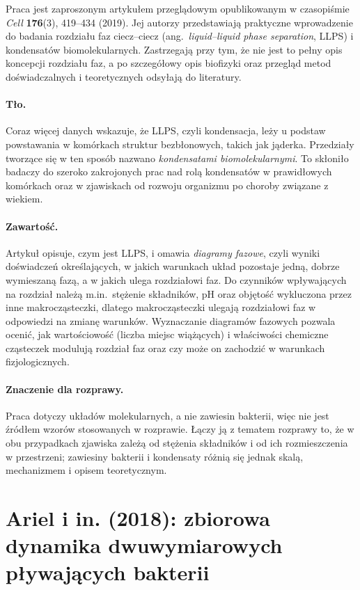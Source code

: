 \documentclass[12pt,a4paper,twoside,openright]{report}
\theoremstyle{definition}
\theoremstyle{remark}
\begin{document}
Praca \cite{alberti2019considerations} jest zaproszonym artykułem przeglądowym opublikowanym w czasopiśmie \emph{Cell} \textbf{176}(3), 419--434 (2019). Jej autorzy przedstawiają praktyczne wprowadzenie do badania rozdziału faz ciecz--ciecz (ang.\ \emph{liquid--liquid phase separation}, LLPS) i kondensatów biomolekularnych. Zastrzegają przy tym, że nie jest to pełny opis koncepcji rozdziału faz, a po szczegółowy opis biofizyki oraz przegląd metod doświadczalnych i teoretycznych odsyłają do literatury.

\paragraph{Tło.} Coraz więcej danych wskazuje, że LLPS, czyli kondensacja, leży u podstaw powstawania w komórkach struktur bezbłonowych, takich jak jąderka. Przedziały tworzące się w ten sposób nazwano \emph{kondensatami biomolekularnymi}. To skłoniło badaczy do szeroko zakrojonych prac nad rolą kondensatów w prawidłowych komórkach oraz w zjawiskach od rozwoju organizmu po choroby związane z wiekiem.

\paragraph{Zawartość.} Artykuł opisuje, czym jest LLPS, i omawia \emph{diagramy fazowe}, czyli wyniki doświadczeń określających, w jakich warunkach układ pozostaje jedną, dobrze wymieszaną fazą, a w jakich ulega rozdziałowi faz. Do czynników wpływających na rozdział należą m.in.\ stężenie składników, pH oraz objętość wykluczona przez inne makrocząsteczki, dlatego makrocząsteczki ulegają rozdziałowi faz w odpowiedzi na zmianę warunków. Wyznaczanie diagramów fazowych pozwala ocenić, jak wartościowość (liczba miejsc wiążących) i właściwości chemiczne cząsteczek modulują rozdział faz oraz czy może on zachodzić w warunkach fizjologicznych.

\paragraph{Znaczenie dla rozprawy.} Praca dotyczy układów molekularnych, a nie zawiesin bakterii, więc nie jest źródłem wzorów stosowanych w rozprawie. Łączy ją z tematem rozprawy to, że w obu przypadkach zjawiska zależą od stężenia składników i od ich rozmieszczenia w przestrzeni; zawiesiny bakterii i kondensaty różnią się jednak skalą, mechanizmem i opisem teoretycznym.

\section{Ariel i in. (2018): zbiorowa dynamika dwuwymiarowych pływających bakterii}\label{ssec:ariel}
\end{document}

